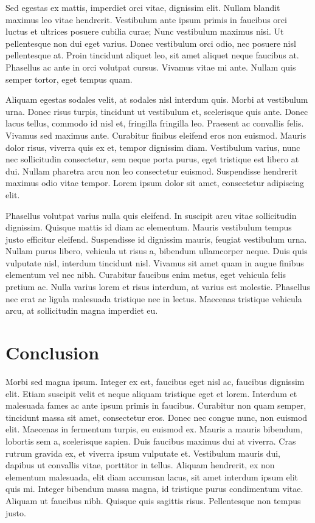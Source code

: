 Sed egestas ex mattis, imperdiet orci vitae, dignissim elit. Nullam blandit maximus leo vitae hendrerit. Vestibulum ante ipsum primis in faucibus orci luctus et ultrices posuere cubilia curae; Nunc vestibulum maximus nisi. Ut pellentesque non dui eget varius. Donec vestibulum orci odio, nec posuere nisl pellentesque at. Proin tincidunt aliquet leo, sit amet aliquet neque faucibus at. Phasellus ac ante in orci volutpat cursus. Vivamus vitae mi ante. Nullam quis semper tortor, eget tempus quam.

Aliquam egestas sodales velit, at sodales nisl interdum quis. Morbi at vestibulum urna. Donec risus turpis, tincidunt ut vestibulum et, scelerisque quis ante. Donec lacus tellus, commodo id nisl et, fringilla fringilla leo. Praesent ac convallis felis. Vivamus sed maximus ante. Curabitur finibus eleifend eros non euismod. Mauris dolor risus, viverra quis ex et, tempor dignissim diam. Vestibulum varius, nunc nec sollicitudin consectetur, sem neque porta purus, eget tristique est libero at dui. Nullam pharetra arcu non leo consectetur euismod. Suspendisse hendrerit maximus odio vitae tempor. Lorem ipsum dolor sit amet, consectetur adipiscing elit.

Phasellus volutpat varius nulla quis eleifend. In suscipit arcu vitae sollicitudin dignissim. Quisque mattis id diam ac elementum. Mauris vestibulum tempus justo efficitur eleifend. Suspendisse id dignissim mauris, feugiat vestibulum urna. Nullam purus libero, vehicula ut risus a, bibendum ullamcorper neque. Duis quis vulputate nisl, interdum tincidunt nisl. Vivamus sit amet quam in augue finibus elementum vel nec nibh. Curabitur faucibus enim metus, eget vehicula felis pretium ac. Nulla varius lorem et risus interdum, at varius est molestie. Phasellus nec erat ac ligula malesuada tristique nec in lectus. Maecenas tristique vehicula arcu, at sollicitudin magna imperdiet eu.

\section{Conclusion}

Morbi sed magna ipsum. Integer ex est, faucibus eget nisl ac, faucibus dignissim elit. Etiam suscipit velit et neque aliquam tristique eget et lorem. Interdum et malesuada fames ac ante ipsum primis in faucibus. Curabitur non quam semper, tincidunt massa sit amet, consectetur eros. Donec nec congue nunc, non euismod elit. Maecenas in fermentum turpis, eu euismod ex. Mauris a mauris bibendum, lobortis sem a, scelerisque sapien. Duis faucibus maximus dui at viverra. Cras rutrum gravida ex, et viverra ipsum vulputate et. Vestibulum mauris dui, dapibus ut convallis vitae, porttitor in tellus. Aliquam hendrerit, ex non elementum malesuada, elit diam accumsan lacus, sit amet interdum ipsum elit quis mi. Integer bibendum massa magna, id tristique purus condimentum vitae. Aliquam ut faucibus nibh. Quisque quis sagittis risus. Pellentesque non tempus justo.

